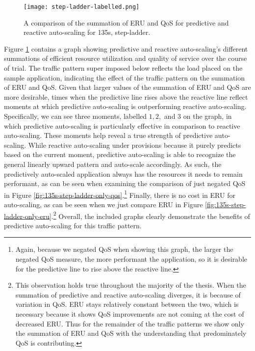 \begin{figure}[!h]
  \centerline{\texttt{[image: step-ladder-labelled.png]}}
  \caption{A comparison of the summation of ERU and QoS for
    predictive and reactive auto-scaling for 135s, step-ladder.}
  \label{fig:135s-step-ladder-labelled}
\end{figure}

Figure \ref{fig:135s-step-ladder-labelled} contains a graph
showing predictive and reactive auto-scaling's different
summations of efficient resource utilization and quality of service over the
course of trial. The traffic pattern super imposed below reflects the load
placed on the sample application, indicating the effect of the traffic pattern
on the summation of ERU and QoS. Given that larger values of the summation of ERU and QoS
are more desirable, times when the predictive line rises above the reactive line
reflect moments at which predictive auto-scaling is outperforming reactive
auto-scaling. Specifically, we can see three moments, labelled $1, 2,$ and
$3$ on the graph, in which predictive auto-scaling is particularly effective in
comparison to reactive auto-scaling. These moments help reveal a true strength of
predictive auto-scaling. While reactive auto-scaling under provisions because it
purely predicts based on the current moment, predictive auto-scaling is able to
recognize the general linearly upward pattern and auto-scale accordingly. As
such, the predictively auto-scaled application always has the resources it needs
to remain performant, as can be seen when examining the comparison of just
negated QoS in Figure \ref{fig:135s-step-ladder-only-qos}.\footnote{Again,
because we negated QoS when showing this graph, the larger the negated QoS
measure, the more performant the application, so it is desirable for the
predictive line to rise above the reactive line.} Finally, there is no cost in
ERU for auto-scaling, as can be seen when we just compare ERU in Figure
\ref{fig:135s-step-ladder-only-eru}.\footnote{This observation holds true
throughout the majority of the thesis. When the summation of predictive and
reactive auto-scaling diverges, it is because of variation in QoS. ERU stays
relatively constant between the two, which is necessary because it shows QoS
improvements are not coming at the cost of decreased ERU.
Thus for the remainder of the traffic
patterns we show only the summation of ERU and QoS with the understanding that
predominately QoS is contributing.} Overall, the included graphs clearly
demonstrate the benefits of predictive auto-scaling for this traffic pattern.

